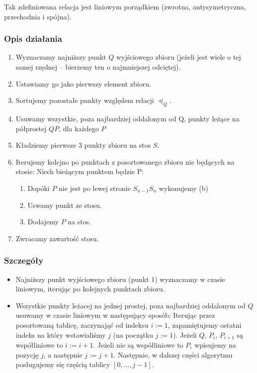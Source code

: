 \documentclass[11pt]{article}
\theoremstyle{remark} \newtheorem{definition}{def.}
\theoremstyle{definition} \newtheorem{twierdzenie}{tw.}
\begin{document}
    Tak zdefiniowana relacja jest liniowym porządkiem (zwrotna, antysymetryczna, przechodnia i spójna).

    \subsubsection{Opis działania}

    \begin{enumerate}
        \item   Wyznaczamy najniższy punkt $Q$ wyjściowego zbioru (jeżeli jest wiele o tej samej rzędnej -- bierzemy ten o najmniejszej odciętej).
        \item   Ustawiamy go jako pierwszy element zbioru. 
        \item   Sortujemy pozostałe punkty względem relacji $\preceq_Q$.
        \item   Usuwamy wszystkie, poza najbardziej oddalonym od Q, punkty leżące na półprostej $QP$, dla każdego $P$
        \item   Kładziemy pierwsze 3 punkty zbioru na stos $S$. 
        \item   Iterujemy kolejno po punktach z posortowanego zbioru nie będących na stosie:
                Niech bieżącym punktem będzie P:

                \begin{enumerate}
                    \item   Dopóki $P$ nie jest po lewej stronie $S_{n-1}S_n$ wykonujemy (b)
                    \item   Uswamy punkt ze stosu. 
                    \item   Dodajemy $P$ na stos.
                \end{enumerate}
        \item Zwracamy zawartość stosu.
    \end{enumerate}


    \subsubsection{Szczegóły}

    \begin{itemize}
        \item   Najniższy punkt wyjściowego zbioru (punkt 1) wyznaczamy w czasie liniowym, iterując po kolejnych punktach zbioru. 
        \item   Wszystkie punkty leżacej na jednej prostej, poza najbardziej oddalonym od $Q$ usuwamy w czasie liniowym w następujący sposób:
                Iterując przez posortowaną tablicę, zaczynająć od indeksu $i := 1$, zapamiętujemy ostatni indeks na który wstawialiśmy $j$ (na początku $j := 1$).
                Jeżeli $Q$, $P_i$, $P_{i+1}$ są współliniowe to $i := i+1$. Jeżeli nie są współliniowe to $P_i$ wpisujemy na pozycję $j$, a następnie $j := j + 1$. Następnie, 
                w dalszej części algorytmu posługujemy się częścią tablicy $[0, \ldots, j - 1]$.
    \end{itemize}    
\end{document}
